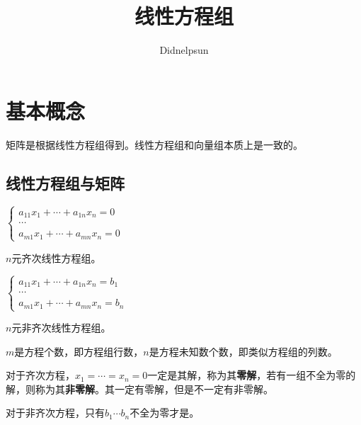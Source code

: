 \documentclass[UTF8, 12pt]{ctexart}
\author{Didnelpsun}
\title{线性方程组}
\date{}
\begin{document}
\maketitle
\pagestyle{empty}
\thispagestyle{empty}
\tableofcontents
\thispagestyle{empty}
\newpage
\pagestyle{plain}
\setcounter{page}{1}
\section{基本概念}

矩阵是根据线性方程组得到。线性方程组和向量组本质上是一致的。

\subsection{线性方程组与矩阵}

\begin{multicols}{2}
    
    $\begin{cases}
        a_{11}x_1+\cdots+a_{1n}x_n=0 \\
        \cdots \\
        a_{m1}x_1+\cdots+a_{mn}x_n=0
    \end{cases}$ \medskip
    
    $n$元齐次线性方程组。

    $\begin{cases}
        a_{11}x_1+\cdots+a_{1n}x_n=b_1 \\
        \cdots \\
        a_{m1}x_1+\cdots+a_{mn}x_n=b_n
    \end{cases}$ \medskip
    
    $n$元非齐次线性方程组。

\end{multicols}

$m$是方程个数，即方程组行数，$n$是方程未知数个数，即类似方程组的列数。

对于齐次方程，$x_1=\cdots=x_n=0$一定是其解，称为其\textbf{零解}，若有一组不全为零的解，则称为其\textbf{非零解}。其一定有零解，但是不一定有非零解。

对于非齐次方程，只有$b_1\cdots b_n$不全为零才是。\medskip
\end{document}
